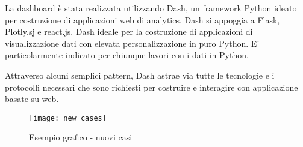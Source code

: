 
La dashboard è stata realizzata utilizzando Dash, un framework Python ideato per costruzione di applicazioni web di analytics.
Dash si appoggia a Flask, Plotly.sj e react.js. Dash ideale per la costruzione di applicazioni di visualizzazione dati con elevata personalizzazione in puro Python. E’ particolarmente indicato per chiunque lavori con i dati in Python.

Attraverso alcuni semplici pattern, Dash astrae via tutte le tecnologie e i protocolli necessari che sono richiesti per costruire e interagire con applicazione basate su web.

\begin{figure}[htp]
    \centering
    \texttt{[image: new\_cases]}
    \caption{Esempio grafico - nuovi casi}
    \label{fig:chart_example}
\end{figure}